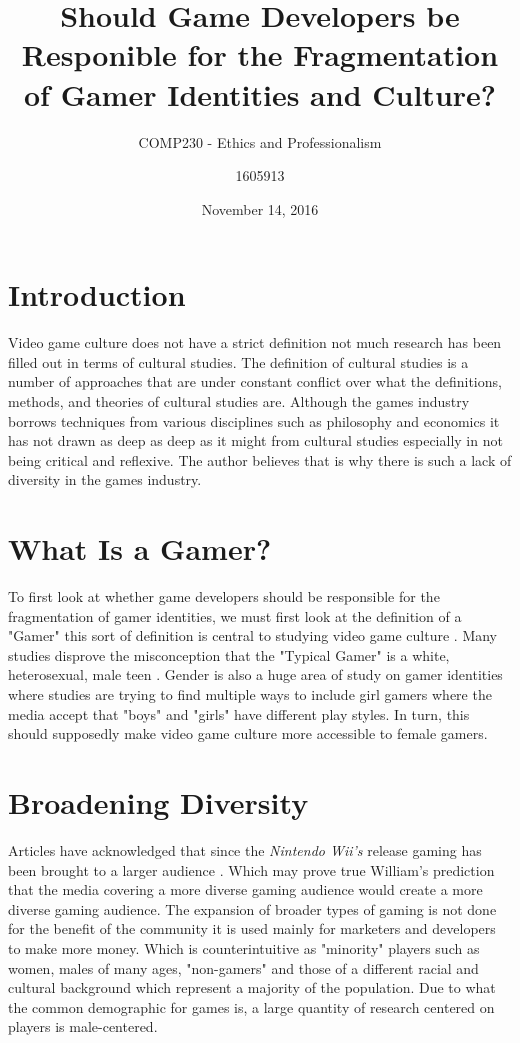 \documentclass[11pt]{scrartcl}
\title{Should Game Developers be Responible for the Fragmentation of Gamer Identities and Culture?}
\date{November 14, 2016}
\subtitle{COMP230 - Ethics and Professionalism}
\author{1605913}
\begin{document}
\maketitle

\section{Introduction}

Video game culture does not have a strict definition not much research has been filled out in terms of cultural studies. The definition of cultural studies is a number of approaches that are under constant conflict over what the definitions, methods, and theories of cultural studies are\cite{shaw2010video}. Although the games industry borrows techniques from various disciplines such as philosophy and economics it has not drawn as deep as deep as it might from cultural studies especially in not being critical and reflexive. The author believes that is why there is such a lack of diversity in the games industry\cite{shaw2010video}.

\section{What Is a Gamer?}

To first look at whether game developers should be responsible for the fragmentation of gamer identities, we must first look at the definition of a "Gamer" this sort of definition is central to studying video game culture \cite{shaw2010video}. Many studies disprove the misconception that the "Typical Gamer" is a white, heterosexual, male teen \cite{JCC4:JCC4428}. Gender is also a huge area of study on gamer identities where studies are trying to find multiple ways to include girl gamers where the media accept that "boys" and "girls" have different play styles. In turn, this should supposedly make video game culture more accessible to female gamers.\cite{cassell2000barbie}


\section{Broadening Diversity}

Articles have acknowledged that since the \emph{Nintendo Wii's} release gaming has been brought to a larger audience \cite{schiesel_2007}. Which may prove true William's prediction that the media covering a more diverse gaming audience would create a more diverse gaming audience. \cite{williams2003video} The expansion of broader types of gaming is not done for the benefit of the community it is used mainly for marketers and developers to make more money.\cite{elliott_2005} Which is counterintuitive as "minority" players such as women, males of many ages, "non-gamers" and those of a different racial and cultural background which represent a majority of the population.\cite{fron2007hegemony} Due to what the common demographic for games is, a large quantity of research centered on players is male-centered.\cite{fron2007hegemony}
\end{document}
